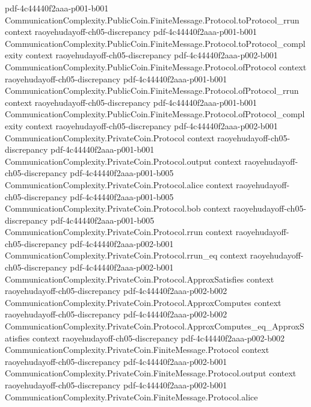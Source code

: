 \begin{theorem}
  {pdf-4c44440f2aaa-p001-b001}
\proofstep
  {CommunicationComplexity.PublicCoin.FiniteMessage.Protocol.toProtocol_rrun}
  {context}
  {raoyehudayoff-ch05-discrepancy}
  {pdf-4c44440f2aaa-p001-b001}
\proofstep
  {CommunicationComplexity.PublicCoin.FiniteMessage.Protocol.toProtocol_complexity}
  {context}
  {raoyehudayoff-ch05-discrepancy}
  {pdf-4c44440f2aaa-p002-b001}
\proofstep
  {CommunicationComplexity.PublicCoin.FiniteMessage.Protocol.ofProtocol}
  {context}
  {raoyehudayoff-ch05-discrepancy}
  {pdf-4c44440f2aaa-p001-b001}
\proofstep
  {CommunicationComplexity.PublicCoin.FiniteMessage.Protocol.ofProtocol_rrun}
  {context}
  {raoyehudayoff-ch05-discrepancy}
  {pdf-4c44440f2aaa-p001-b001}
\proofstep
  {CommunicationComplexity.PublicCoin.FiniteMessage.Protocol.ofProtocol_complexity}
  {context}
  {raoyehudayoff-ch05-discrepancy}
  {pdf-4c44440f2aaa-p002-b001}
\proofstep
  {CommunicationComplexity.PrivateCoin.Protocol}
  {context}
  {raoyehudayoff-ch05-discrepancy}
  {pdf-4c44440f2aaa-p001-b001}
\proofstep
  {CommunicationComplexity.PrivateCoin.Protocol.output}
  {context}
  {raoyehudayoff-ch05-discrepancy}
  {pdf-4c44440f2aaa-p001-b005}
\proofstep
  {CommunicationComplexity.PrivateCoin.Protocol.alice}
  {context}
  {raoyehudayoff-ch05-discrepancy}
  {pdf-4c44440f2aaa-p001-b005}
\proofstep
  {CommunicationComplexity.PrivateCoin.Protocol.bob}
  {context}
  {raoyehudayoff-ch05-discrepancy}
  {pdf-4c44440f2aaa-p001-b005}
\proofstep
  {CommunicationComplexity.PrivateCoin.Protocol.rrun}
  {context}
  {raoyehudayoff-ch05-discrepancy}
  {pdf-4c44440f2aaa-p002-b001}
\proofstep
  {CommunicationComplexity.PrivateCoin.Protocol.rrun_eq}
  {context}
  {raoyehudayoff-ch05-discrepancy}
  {pdf-4c44440f2aaa-p002-b001}
\proofstep
  {CommunicationComplexity.PrivateCoin.Protocol.ApproxSatisfies}
  {context}
  {raoyehudayoff-ch05-discrepancy}
  {pdf-4c44440f2aaa-p002-b002}
\proofstep
  {CommunicationComplexity.PrivateCoin.Protocol.ApproxComputes}
  {context}
  {raoyehudayoff-ch05-discrepancy}
  {pdf-4c44440f2aaa-p002-b002}
\proofstep
  {CommunicationComplexity.PrivateCoin.Protocol.ApproxComputes_eq_ApproxSatisfies}
  {context}
  {raoyehudayoff-ch05-discrepancy}
  {pdf-4c44440f2aaa-p002-b002}
\proofstep
  {CommunicationComplexity.PrivateCoin.FiniteMessage.Protocol}
  {context}
  {raoyehudayoff-ch05-discrepancy}
  {pdf-4c44440f2aaa-p002-b001}
\proofstep
  {CommunicationComplexity.PrivateCoin.FiniteMessage.Protocol.output}
  {context}
  {raoyehudayoff-ch05-discrepancy}
  {pdf-4c44440f2aaa-p002-b001}
\proofstep
  {CommunicationComplexity.PrivateCoin.FiniteMessage.Protocol.alice}

\end{theorem}
